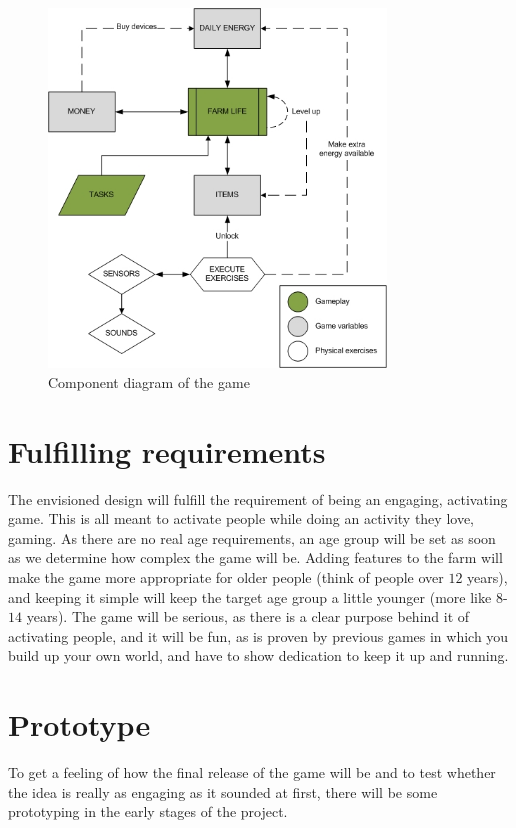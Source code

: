 \documentclass[a4paper,11pt,notitlepage]{report}
\begin{document}
\begin{figure}[h]
	\centering
		\includegraphics[width=0.80\textwidth]{Images/gameconcept.png}
	\caption{Component diagram of the game}
	\label{fig:gameconcept}
\end{figure}

\section{Fulfilling requirements}
The envisioned design will fulfill the requirement of being an engaging, activating game. This is all meant to activate people while doing an activity they love, gaming. As there are no real age requirements, an age group will be set as soon as we determine how complex the game will be. Adding features to the farm will make the game more appropriate for older people (think of people over $12$ years), and keeping it simple will keep the target age group a little younger (more like $8$-$14$ years). The game will be serious, as there is a clear purpose behind it of activating people, and it will be fun, as is proven by previous games in which you build up your own world, and have to show dedication to keep it up and running.

\section{Prototype}
To get a feeling of how the final release of the game will be and to test whether the idea is really as engaging as it sounded at first, there will be some prototyping in the early stages of the project.
\end{document}
